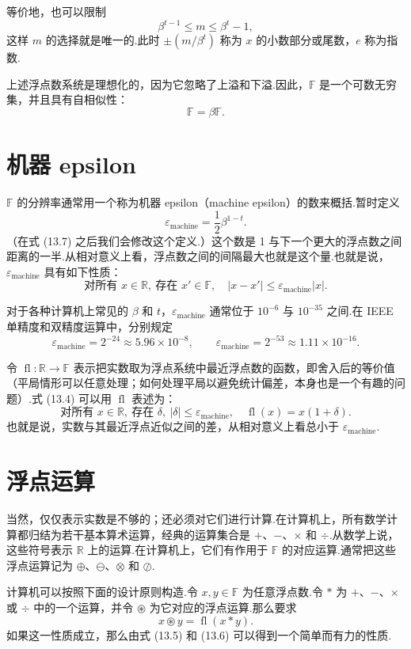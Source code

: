 \documentclass[UTF8,fontset=none,12pt]{ctexart}
\newcommand{\R}{\mathbb{R}}
\newcommand{\F}{\mathbb{F}}
\newcommand{\fl}{\operatorname{fl}}
\newcommand{\epsmach}{\varepsilon_{\mathrm{machine}}}
\theoremstyle{definition}
\begin{document}
等价地，也可以限制
\[
    \beta^{t-1}\le m\le\beta^t-1,
\]
这样 $m$ 的选择就是唯一的.此时 $\pm(m/\beta^t)$ 称为 $x$ 的小数部分或尾数，$e$ 称为指数.

上述浮点数系统是理想化的，因为它忽略了上溢和下溢.因此，$\F$ 是一个可数无穷集，并且具有自相似性：
\[
    \F=\beta\F.
\]

\section*{机器 epsilon}

$\F$ 的分辨率通常用一个称为机器 epsilon（machine epsilon）的数来概括.暂时定义
\begin{equation}
    \epsmach=\frac12\beta^{1-t}.
    \tag{13.3}
\end{equation}
（在式 (13.7) 之后我们会修改这个定义.）这个数是 1 与下一个更大的浮点数之间距离的一半.从相对意义上看，浮点数之间的间隔最大也就是这个量.也就是说，$\epsmach$ 具有如下性质：
\begin{equation}
    \text{对所有 }x\in\R,\ \text{存在 }x'\in\F,\quad
    |x-x'|\le\epsmach|x|.
    \tag{13.4}
\end{equation}

对于各种计算机上常见的 $\beta$ 和 $t$，$\epsmach$ 通常位于 $10^{-6}$ 与 $10^{-35}$ 之间.在 IEEE 单精度和双精度运算中，分别规定
\[
    \epsmach=2^{-24}\approx5.96\times10^{-8},
    \qquad
    \epsmach=2^{-53}\approx1.11\times10^{-16}.
\]

令 $\fl:\R\to\F$ 表示把实数取为浮点系统中最近浮点数的函数，即舍入后的等价值（平局情形可以任意处理；如何处理平局以避免统计偏差，本身也是一个有趣的问题）.式 (13.4) 可以用 $\fl$ 表述为：
\begin{equation}
    \text{对所有 }x\in\R,\ \text{存在 }\delta,\ |\delta|\le\epsmach,
    \quad \fl(x)=x(1+\delta).
    \tag{13.5}
\end{equation}
也就是说，实数与其最近浮点近似之间的差，从相对意义上看总小于 $\epsmach$.

\section*{浮点运算}

当然，仅仅表示实数是不够的；还必须对它们进行计算.在计算机上，所有数学计算都归结为若干基本算术运算，经典的运算集合是 $+$、$-$、$\times$ 和 $\div$.从数学上说，这些符号表示 $\R$ 上的运算.在计算机上，它们有作用于 $\F$ 的对应运算.通常把这些浮点运算记为 $\oplus$、$\ominus$、$\otimes$ 和 $\oslash$.

计算机可以按照下面的设计原则构造.令 $x,y\in\F$ 为任意浮点数.令 $*$ 为 $+$、$-$、$\times$ 或 $\div$ 中的一个运算，并令 $\circledast$ 为它对应的浮点运算.那么要求
\begin{equation}
    x\circledast y=\fl(x*y).
    \tag{13.6}
\end{equation}
如果这一性质成立，那么由式 (13.5) 和 (13.6) 可以得到一个简单而有力的性质.
\end{document}
